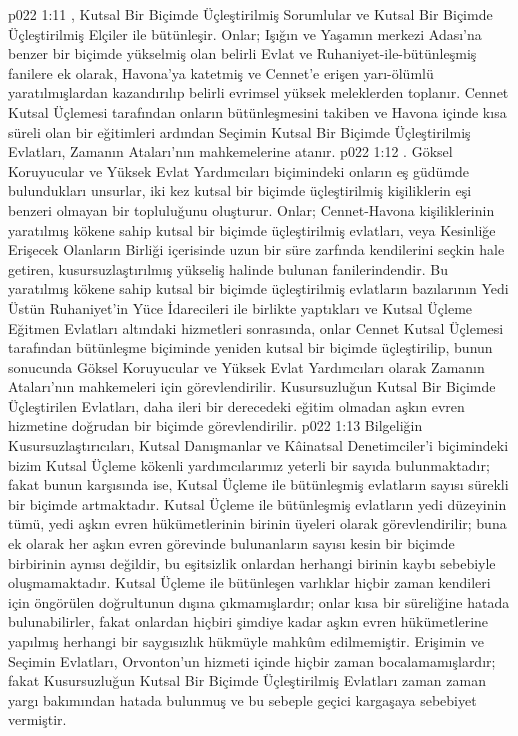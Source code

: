 \vs p022 1:11 , Kutsal Bir Biçimde Üçleştirilmiş Sorumlular ve Kutsal Bir Biçimde Üçleştirilmiş Elçiler ile bütünleşir. Onlar; Işığın ve Yaşamın merkezi Adası’na benzer bir biçimde yükselmiş olan belirli Evlat ve Ruhaniyet\hyp{}ile\hyp{}bütünleşmiş fanilere ek olarak, Havona’ya katetmiş ve Cennet’e erişen yarı\hyp{}ölümlü yaratılmışlardan kazandırılıp belirli evrimsel yüksek meleklerden toplanır. Cennet Kutsal Üçlemesi tarafından onların bütünleşmesini takiben ve Havona içinde kısa süreli olan bir eğitimleri ardından Seçimin Kutsal Bir Biçimde Üçleştirilmiş Evlatları, Zamanın Ataları’nın mahkemelerine atanır.
\vs p022 1:12 . Göksel Koruyucular ve Yüksek Evlat Yardımcıları biçimindeki onların eş güdümde bulundukları unsurlar, iki kez kutsal bir biçimde üçleştirilmiş kişiliklerin eşi benzeri olmayan bir topluluğunu oluşturur. Onlar; Cennet\hyp{}Havona kişiliklerinin yaratılmış kökene sahip kutsal bir biçimde üçleştirilmiş evlatları, veya Kesinliğe Erişecek Olanların Birliği içerisinde uzun bir süre zarfında kendilerini seçkin hale getiren, kusursuzlaştırılmış yükseliş halinde bulunan fanilerindendir. Bu yaratılmış kökene sahip kutsal bir biçimde üçleştirilmiş evlatların bazılarının Yedi Üstün Ruhaniyet’in Yüce İdarecileri ile birlikte yaptıkları ve Kutsal Üçleme Eğitmen Evlatları altındaki hizmetleri sonrasında, onlar Cennet Kutsal Üçlemesi tarafından bütünleşme biçiminde yeniden kutsal bir biçimde üçleştirilip, bunun sonucunda Göksel Koruyucular ve Yüksek Evlat Yardımcıları olarak Zamanın Ataları’nın mahkemeleri için görevlendirilir. Kusursuzluğun Kutsal Bir Biçimde Üçleştirilen Evlatları, daha ileri bir derecedeki eğitim olmadan aşkın evren hizmetine doğrudan bir biçimde görevlendirilir.
\vs p022 1:13 Bilgeliğin Kusursuzlaştırıcıları, Kutsal Danışmanlar ve Kâinatsal Denetimciler’i biçimindeki bizim Kutsal Üçleme kökenli yardımcılarımız yeterli bir sayıda bulunmaktadır; fakat bunun karşısında ise, Kutsal Üçleme ile bütünleşmiş evlatların sayısı sürekli bir biçimde artmaktadır. Kutsal Üçleme ile bütünleşmiş evlatların yedi düzeyinin tümü, yedi aşkın evren hükümetlerinin birinin üyeleri olarak görevlendirilir; buna ek olarak her aşkın evren görevinde bulunanların sayısı kesin bir biçimde birbirinin aynısı değildir, bu eşitsizlik onlardan herhangi birinin kaybı sebebiyle oluşmamaktadır. Kutsal Üçleme ile bütünleşen varlıklar hiçbir zaman kendileri için öngörülen doğrultunun dışına çıkmamışlardır; onlar kısa bir süreliğine hatada bulunabilirler, fakat onlardan hiçbiri şimdiye kadar aşkın evren hükümetlerine yapılmış herhangi bir saygısızlık hükmüyle mahkûm edilmemiştir. Erişimin ve Seçimin Evlatları, Orvonton’un hizmeti içinde hiçbir zaman bocalamamışlardır; fakat Kusursuzluğun Kutsal Bir Biçimde Üçleştirilmiş Evlatları zaman zaman yargı bakımından hatada bulunmuş ve bu sebeple geçici kargaşaya sebebiyet vermiştir.
